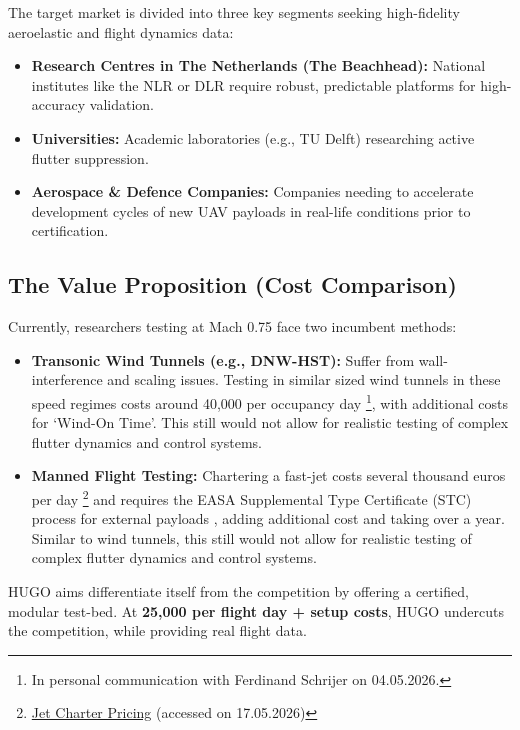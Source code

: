 The target market is divided into three key segments seeking high-fidelity aeroelastic and flight dynamics data:

\begin{itemize}
    \item \textbf{Research Centres in The Netherlands (The Beachhead):} National institutes like the NLR or DLR require robust, predictable platforms for high-accuracy validation.
    \item \textbf{Universities:} Academic laboratories (e.g., TU Delft) researching active flutter suppression.
    \item \textbf{Aerospace \& Defence Companies:} Companies needing to accelerate development cycles of new UAV payloads in real-life conditions prior to certification.
\end{itemize}

\subsection{The Value Proposition (Cost Comparison)}
\label{subsec:Value_Proposition}

Currently, researchers testing at Mach 0.75 face two incumbent methods:

\begin{itemize}
    \item \textbf{Transonic Wind Tunnels (e.g., DNW-HST):} Suffer from wall-interference and scaling issues. Testing in similar sized wind tunnels in these speed regimes costs around \texteuro{}40,000 per occupancy day \footnote{\label{foot:schrijer}In personal communication with Ferdinand Schrijer on 04.05.2026.}, with additional costs for `Wind-On Time'. This still would not allow for realistic testing of complex flutter dynamics and control systems.

    \item \textbf{Manned Flight Testing:} Chartering a fast-jet costs several thousand euros per day \footnote{\label{foot:evojets}\href{https://www.evojets.com/charter-flight-costs-pricing-basics/}{Jet Charter Pricing} (accessed on 17.05.2026)} and requires the EASA Supplemental Type Certificate (STC) process for external payloads \cite{EASAInitialAirworthiness2025}, adding additional cost and taking over a year. Similar to wind tunnels, this still would not allow for realistic testing of complex flutter dynamics and control systems.
\end{itemize}

HUGO aims differentiate itself from the competition by offering a certified, modular test-bed. At \textbf{\texteuro{}25,000 per flight day + setup costs}, HUGO undercuts the competition, while providing real flight data.

